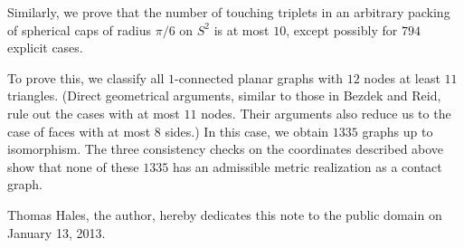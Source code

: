Similarly, we prove that the number of touching triplets in an
arbitrary packing of spherical caps of radius $\pi/6$ on $S^2$ is at
most $10$, except possibly for $794$ explicit cases.

To prove this, we classify all $1$-connected planar graphs with $12$
nodes at least $11$ triangles.  (Direct geometrical arguments, similar
to those in Bezdek and Reid, rule out the cases with at most $11$
nodes.  Their arguments also reduce us to the case of faces with at
most $8$ sides.)  In this case, we obtain $1335$ graphs up to
isomorphism.  The three consistency checks on the coordinates
described above show that none of these $1335$ has an admissible
metric realization as a contact graph.


Thomas Hales, the author, hereby dedicates this note to the public
domain on January 13, 2013.


